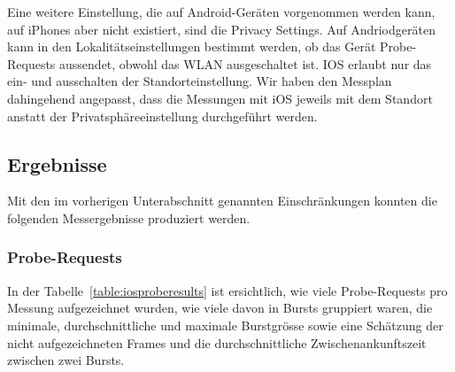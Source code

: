 \clearpage 

Eine weitere Einstellung, die auf Android-Geräten vorgenommen werden kann, auf 
iPhones aber nicht existiert, sind die Privacy Settings.
Auf Andriodgeräten kann in den Lokalitätseinstellungen bestimmt werden, 
ob das Gerät Probe-Requests aussendet, obwohl das WLAN ausgeschaltet ist.
IOS erlaubt nur das ein- und ausschalten der Standorteinstellung.
Wir haben den Messplan dahingehend angepasst, dass die Messungen mit iOS jeweils
mit dem Standort anstatt der Privatsphäreeinstellung durchgeführt werden.

\subsection{Ergebnisse}
Mit den im vorherigen Unterabschnitt genannten Einschränkungen konnten die 
folgenden Messergebnisse produziert werden. 

\subsubsection*{Probe-Requests}
In der Tabelle~\ref{table:iosproberesults} ist ersichtlich, wie viele 
Probe-Requests pro Messung aufgezeichnet wurden, wie viele davon in Bursts 
gruppiert waren, die minimale, durchschnittliche und maximale Burstgrösse 
sowie eine Schätzung der nicht aufgezeichneten Frames und die durchschnittliche 
Zwischenankunftszeit zwischen zwei Bursts.

